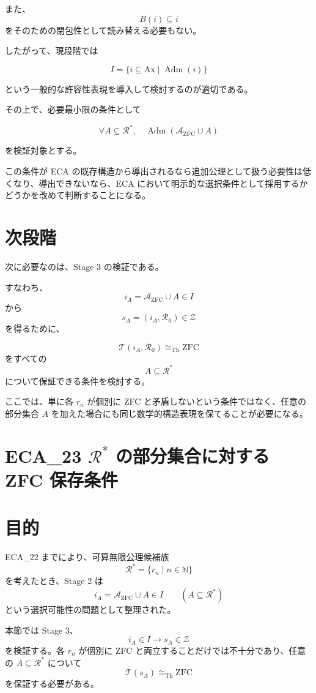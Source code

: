 \documentclass[a4paper,11pt]{article}
\newcommand{\Ax}{\mathrm{Ax}}
\begin{document}
また、
\[
B(i)\subseteq i
\]
をそのための閉包性として読み替える必要もない。

したがって、現段階では

\[
\boxed{
I=\{i\subseteq\Ax\mid\operatorname{Adm}(i)\}
}
\]

という一般的な許容性表現を導入して検討するのが適切である。

その上で、必要最小限の条件として

\[
\boxed{
\forall A\subseteq\mathcal{R}^*,
\quad
\operatorname{Adm}
(\mathcal{A}_{\mathrm{ZFC}}\cup A)
}
\]

を検証対象とする。

この条件が ECA の既存構造から導出されるなら追加公理として扱う必要性は低くなり、導出できないなら、ECA において明示的な選択条件として採用するかどうかを改めて判断することになる。

\section{次段階}

次に必要なのは、Stage 3 の検証である。

すなわち、
\[
i_A=\mathcal{A}_{\mathrm{ZFC}}\cup A\in I
\]
から
\[
s_A=(i_A,\mathcal{R}_0)\in\mathcal{Z}
\]
を得るために、

\[
\mathcal{T}(i_A,\mathcal{R}_0)
\cong_{\mathrm{Th}}
\mathrm{ZFC}
\]
をすべての
\[
A\subseteq\mathcal{R}^*
\]
について保証できる条件を検討する。

ここでは、単に各 $r_n$ が個別に ZFC と矛盾しないという条件ではなく、任意の部分集合 $A$ を加えた場合にも同じ数学的構造表現を保てることが必要になる。

\section{ECA_23 \(\mathcal{R}^*\) の部分集合に対する ZFC 保存条件}


\section{目的}
ECA_22 までにより、可算無限公理候補族
\[
\mathcal{R}^*=\{r_n\mid n\in\mathbb{N}\}
\]
を考えたとき、Stage 2 は
\[
i_A=\mathcal{A}_{\mathrm{ZFC}}\cup A\in I
\qquad(A\subseteq\mathcal{R}^*)
\]
という選択可能性の問題として整理された。

本節では Stage 3、
\[
i_A\in I\longrightarrow s_A\in\mathcal{Z}
\]
を検証する。各 \(r_n\) が個別に ZFC と両立することだけでは不十分であり、任意の \(A\subseteq\mathcal{R}^*\) について
\[
\mathcal{T}(s_A)\cong_{\mathrm{Th}}\mathrm{ZFC}
\]
を保証する必要がある。
\end{document}
